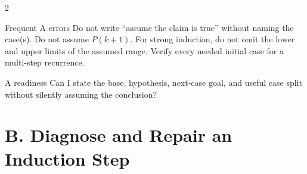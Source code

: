 \documentclass[10pt]{article}
\begin{document}
\begin{multicols}{2}
\begin{warningbox}{Frequent A errors}
Do not write ``assume the claim is true'' without naming the case(s). Do not
assume $P(k+1)$. For strong induction, do not omit the lower and upper limits
of the assumed range. Verify every needed initial case for a multi-step
recurrence.
\end{warningbox}

\begin{checklistbox}{A readiness}
Can I state the base, hypothesis, next-case goal, and useful case split without
silently assuming the conclusion?
\end{checklistbox}
\end{multicols}

\clearpage
\section*{B. Diagnose and Repair an Induction Step}
\end{document}
